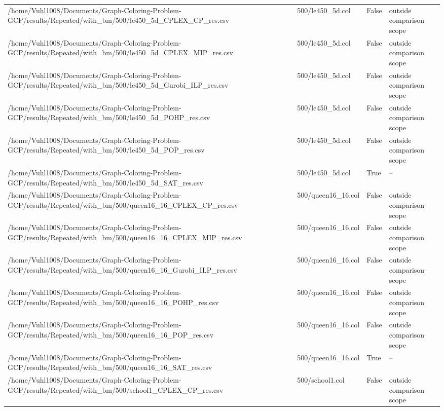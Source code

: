 \begin{table}[htbp]
\begin{tabular}{llll}
/home/Vuhl1008/Documents/Graph-Coloring-Problem-GCP/results/Repeated/with\_bm/500/le450\_5d\_CPLEX\_CP\_res.csv & 500/le450\_5d.col & False & outside comparison scope \\
/home/Vuhl1008/Documents/Graph-Coloring-Problem-GCP/results/Repeated/with\_bm/500/le450\_5d\_CPLEX\_MIP\_res.csv & 500/le450\_5d.col & False & outside comparison scope \\
/home/Vuhl1008/Documents/Graph-Coloring-Problem-GCP/results/Repeated/with\_bm/500/le450\_5d\_Gurobi\_ILP\_res.csv & 500/le450\_5d.col & False & outside comparison scope \\
/home/Vuhl1008/Documents/Graph-Coloring-Problem-GCP/results/Repeated/with\_bm/500/le450\_5d\_POHP\_res.csv & 500/le450\_5d.col & False & outside comparison scope \\
/home/Vuhl1008/Documents/Graph-Coloring-Problem-GCP/results/Repeated/with\_bm/500/le450\_5d\_POP\_res.csv & 500/le450\_5d.col & False & outside comparison scope \\
/home/Vuhl1008/Documents/Graph-Coloring-Problem-GCP/results/Repeated/with\_bm/500/le450\_5d\_SAT\_res.csv & 500/le450\_5d.col & True & -- \\
/home/Vuhl1008/Documents/Graph-Coloring-Problem-GCP/results/Repeated/with\_bm/500/queen16\_16\_CPLEX\_CP\_res.csv & 500/queen16\_16.col & False & outside comparison scope \\
/home/Vuhl1008/Documents/Graph-Coloring-Problem-GCP/results/Repeated/with\_bm/500/queen16\_16\_CPLEX\_MIP\_res.csv & 500/queen16\_16.col & False & outside comparison scope \\
/home/Vuhl1008/Documents/Graph-Coloring-Problem-GCP/results/Repeated/with\_bm/500/queen16\_16\_Gurobi\_ILP\_res.csv & 500/queen16\_16.col & False & outside comparison scope \\
/home/Vuhl1008/Documents/Graph-Coloring-Problem-GCP/results/Repeated/with\_bm/500/queen16\_16\_POHP\_res.csv & 500/queen16\_16.col & False & outside comparison scope \\
/home/Vuhl1008/Documents/Graph-Coloring-Problem-GCP/results/Repeated/with\_bm/500/queen16\_16\_POP\_res.csv & 500/queen16\_16.col & False & outside comparison scope \\
/home/Vuhl1008/Documents/Graph-Coloring-Problem-GCP/results/Repeated/with\_bm/500/queen16\_16\_SAT\_res.csv & 500/queen16\_16.col & True & -- \\
/home/Vuhl1008/Documents/Graph-Coloring-Problem-GCP/results/Repeated/with\_bm/500/school1\_CPLEX\_CP\_res.csv & 500/school1.col & False & outside comparison scope \\

\end{tabular}
\end{table}
